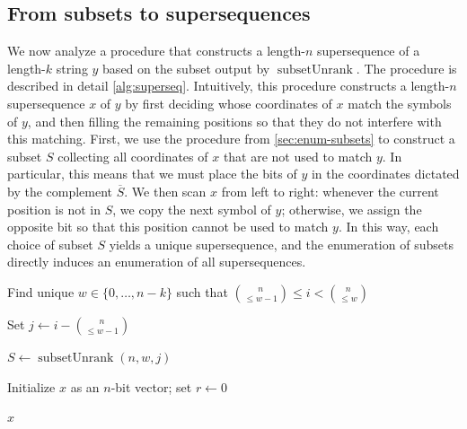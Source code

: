 \documentclass[11pt]{article}
\newcommand{\recsuper}{\operatorname{RecSuperSeq}}
\newcommand{\subunrank}{\operatorname{subsetUnrank}}
\begin{document}
\subsection{From subsets to supersequences}

We now analyze a procedure that constructs a length-$n$ supersequence of a length-$k$ string $y$ based on the subset output by $\subunrank$. 
The procedure is described in detail \cref{alg:superseq}.
Intuitively, this procedure constructs a length-$n$ supersequence $x$ of $y$ by first deciding whose coordinates of $x$ match the symbols of $y$, and then filling the remaining positions so that they do not interfere with this matching. 
First, we use the procedure from \cref{sec:enum-subsets} to construct a subset $S$ collecting all coordinates of $x$ that are not used to match $y$.
In particular, this means that we must place the bits of $y$ in the coordinates dictated by the complement $\overline{S}$. 
We then scan $x$ from left to right: whenever the current position is not in $S$, we copy the next symbol of $y$; otherwise, we assign the opposite bit so that this position cannot be used to match $y$. In this way, each choice of subset $S$ yields a unique supersequence, and the enumeration of subsets directly induces an enumeration of all supersequences.



\begin{algorithm}
\caption{$\recsuper(i,n,k,y)$}
\label{alg:superseq}

Find unique $w\in\{0,\dots,n-k\}$ such that
$\binom{n}{\leq w-1}\le i < \binom{n}{\leq w}$\;

Set $j \gets i -\binom{n}{\leq w-1}$\;

$S \gets \subunrank(n,w,j)$\;

Initialize $x$ as an $n$-bit vector; set $r\gets 0$\;

\Return $x$\;
\end{algorithm}
\end{document}
